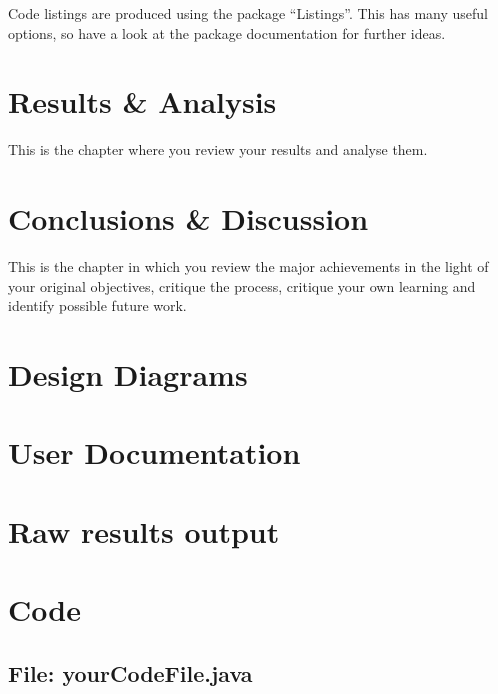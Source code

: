 \documentclass[11pt,openright,a4paper]{report}
\begin{document}
Code listings are produced using the package ``Listings''.  This has many
useful options, so have a look at the package documentation for further
ideas.


\chapter{Results \& Analysis}
This is the chapter where you review your results and analyse them.



\chapter{Conclusions \& Discussion}
%

This is the chapter in which you review the major achievements in the
light of your original objectives, critique the process, critique your
own learning and identify possible future work.





\appendix


\chapter{Design Diagrams}

\chapter{User Documentation}

\chapter{Raw results output}

\chapter{Code}


\begin{landscape}
\begin{multicols}{2}
\section{File: yourCodeFile.java}

\end{multicols}
\end{landscape}
\end{document}
